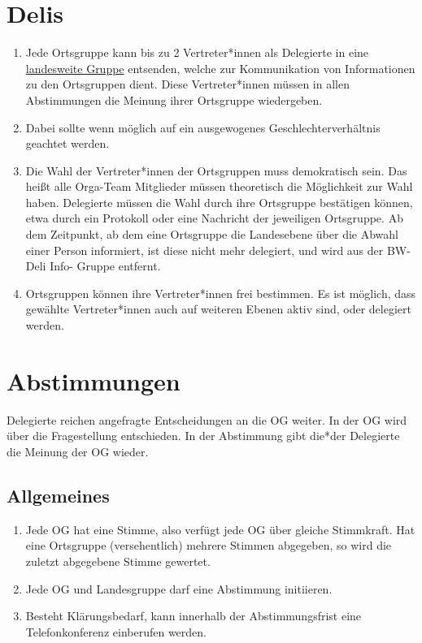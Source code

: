 \documentclass[a4paper,
  ]{scrartcl}
\begin{document}
\section{Delis}
\begin{enumerate}
      \item Jede Ortsgruppe kann bis zu 2 Vertreter*innen als Delegierte in eine \hyperlink{Chatstruktur}{landesweite Gruppe}
            entsenden, welche zur Kommunikation von Informationen zu den Ortsgruppen dient. Diese
            Vertreter*innen müssen in allen Abstimmungen die Meinung ihrer Ortsgruppe wiedergeben.
      \item Dabei sollte wenn möglich auf ein ausgewogenes Geschlechterverhältnis geachtet werden.
      \item Die Wahl der Vertreter*innen der Ortsgruppen muss demokratisch sein. Das heißt alle Orga-Team
            Mitglieder müssen theoretisch die Möglichkeit zur Wahl haben. Delegierte müssen die Wahl durch
            ihre Ortsgruppe bestätigen können, etwa durch ein Protokoll oder eine Nachricht der jeweiligen
            Ortsgruppe. Ab dem Zeitpunkt, ab dem eine Ortsgruppe die Landesebene über die Abwahl einer
            Person informiert, ist diese nicht mehr delegiert, und wird aus der \glqq{}BW-Deli Info\grqq-
            Gruppe entfernt.
      \item Ortsgruppen können ihre Vertreter*innen frei bestimmen. Es ist möglich, dass gewählte
            Vertreter*innen auch auf weiteren Ebenen aktiv sind, oder delegiert werden.

\end{enumerate}
\section{Abstimmungen}
Delegierte reichen angefragte Entscheidungen an die OG weiter. In der OG wird über die Fragestellung
entschieden. In der Abstimmung gibt die*der Delegierte die Meinung der OG wieder.
\subsection{Allgemeines}
\begin{enumerate}
      \item Jede OG hat eine Stimme, also verfügt jede OG über gleiche Stimmkraft. Hat eine Ortsgruppe
            (versehentlich) mehrere Stimmen abgegeben, so wird die zuletzt abgegebene Stimme gewertet.
      \item  Jede OG und Landesgruppe darf eine Abstimmung initiieren.
      \item Besteht Klärungsbedarf, kann innerhalb der Abstimmungsfrist eine Telefonkonferenz einberufen
            werden.
\end{enumerate}
\end{document}
